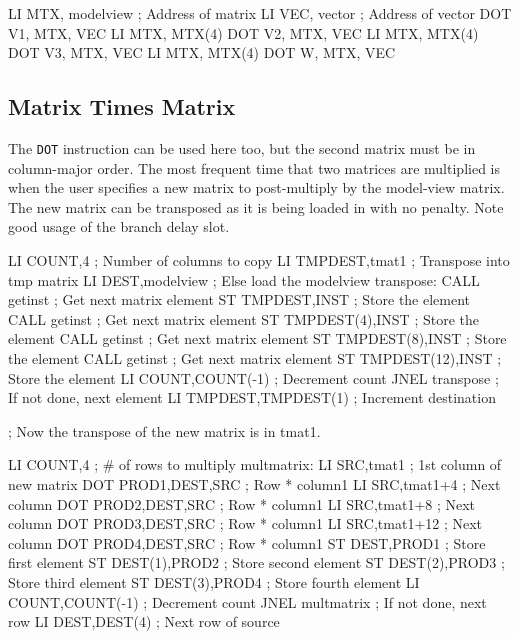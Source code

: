 \documentclass{book}
\begin{document}
\begin{verbatimtab}
    LI	    MTX, modelview	; Address of matrix
    LI	    VEC, vector		; Address of vector
    DOT	    V1, MTX, VEC
    LI	    MTX, MTX(4)
    DOT	    V2, MTX, VEC
    LI	    MTX, MTX(4)
    DOT	    V3, MTX, VEC
    LI	    MTX, MTX(4)
    DOT	    W, MTX, VEC
\end{verbatimtab}

\subsection{Matrix Times Matrix}

The {\tt DOT} instruction can be used here too, but the second matrix
must be in column-major order.  The most frequent time that two
matrices are multiplied is when the user specifies a new matrix to 
post-multiply by the model-view matrix.  The new matrix can be
transposed as it is being loaded in with no penalty.  Note good
usage of the branch delay slot.

\begin{verbatimtab}
    LI	    COUNT,4		; Number of columns to copy
    LI	    TMPDEST,tmat1	; Transpose into tmp matrix
    LI	    DEST,modelview	; Else load the modelview
transpose:
    CALL    getinst		; Get next matrix element
    ST	    TMPDEST,INST	; Store the element
    CALL    getinst		; Get next matrix element
    ST	    TMPDEST(4),INST	; Store the element
    CALL    getinst		; Get next matrix element
    ST	    TMPDEST(8),INST	; Store the element
    CALL    getinst		; Get next matrix element
    ST	    TMPDEST(12),INST	; Store the element
    LI	    COUNT,COUNT(-1)	; Decrement count
    JNEL    transpose		; If not done, next element
    LI	    TMPDEST,TMPDEST(1)	; Increment destination

    ; Now the transpose of the new matrix is in tmat1.

    LI	    COUNT,4		; # of rows to multiply
multmatrix:
    LI	    SRC,tmat1		; 1st column of new matrix
    DOT	    PROD1,DEST,SRC	; Row * column1
    LI	    SRC,tmat1+4		; Next column
    DOT	    PROD2,DEST,SRC	; Row * column1
    LI	    SRC,tmat1+8		; Next column
    DOT	    PROD3,DEST,SRC	; Row * column1
    LI	    SRC,tmat1+12	; Next column
    DOT	    PROD4,DEST,SRC	; Row * column1
    ST	    DEST,PROD1		; Store first element
    ST	    DEST(1),PROD2	; Store second element
    ST	    DEST(2),PROD3	; Store third element
    ST	    DEST(3),PROD4	; Store fourth element
    LI	    COUNT,COUNT(-1)	; Decrement count
    JNEL    multmatrix		; If not done, next row
    LI	    DEST,DEST(4)	; Next row of source
\end{verbatimtab}
\end{document}
